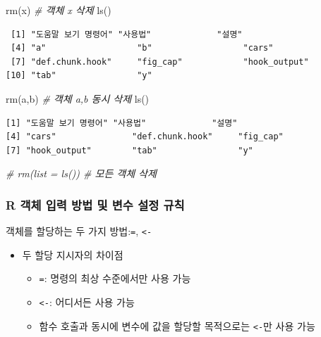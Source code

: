\documentclass[
  11pt,
]{krantz}
\newenvironment{Shaded}{\begin{snugshade}}{\end{snugshade}}
\newcommand{\CommentTok}[1]{\textcolor[rgb]{0.37,0.37,0.37}{\textit{#1}}}
\newcommand{\FunctionTok}[1]{\textcolor[rgb]{0,0,0}{#1}}
\newcommand{\NormalTok}[1]{#1}
\providecommand{\tightlist}{%
  \setlength{\itemsep}{0pt}\setlength{\parskip}{0pt}}
\begin{document}
\normalsize

\footnotesize

\begin{Shaded}
\begin{Highlighting}[]
\FunctionTok{rm}\NormalTok{(x) }\CommentTok{\# 객체 x 삭제}
\FunctionTok{ls}\NormalTok{()}
\end{Highlighting}
\end{Shaded}

\begin{verbatim}
 [1] "도움말 보기 명령어" "사용법"             "설명"              
 [4] "a"                  "b"                  "cars"              
 [7] "def.chunk.hook"     "fig_cap"            "hook_output"       
[10] "tab"                "y"                 
\end{verbatim}

\begin{Shaded}
\begin{Highlighting}[]
\FunctionTok{rm}\NormalTok{(a,b) }\CommentTok{\# 객체 a,b 동시 삭제}
\FunctionTok{ls}\NormalTok{()}
\end{Highlighting}
\end{Shaded}

\begin{verbatim}
[1] "도움말 보기 명령어" "사용법"             "설명"              
[4] "cars"               "def.chunk.hook"     "fig_cap"           
[7] "hook_output"        "tab"                "y"                 
\end{verbatim}

\begin{Shaded}
\begin{Highlighting}[]
\CommentTok{\# rm(list = ls()) \# 모든 객체 삭제}
\end{Highlighting}
\end{Shaded}

\normalsize

\hypertarget{r-object-nam-rule}{%
\subsubsection*{R 객체 입력 방법 및 변수 설정 규칙}\label{r-object-nam-rule}}


객체를 할당하는 두 가지 방법:\texttt{=}, \texttt{\textless{}-}

\begin{itemize}
\tightlist
\item
  두 할당 지시자의 차이점

  \begin{itemize}
  \tightlist
  \item
    \texttt{=}: 명령의 최상 수준에서만 사용 가능
  \item
    \texttt{\textless{}-}: 어디서든 사용 가능
  \item
    함수 호출과 동시에 변수에 값을 할당할 목적으로는 \texttt{\textless{}-}만 사용 가능
  \end{itemize}
\end{itemize}
\end{document}
